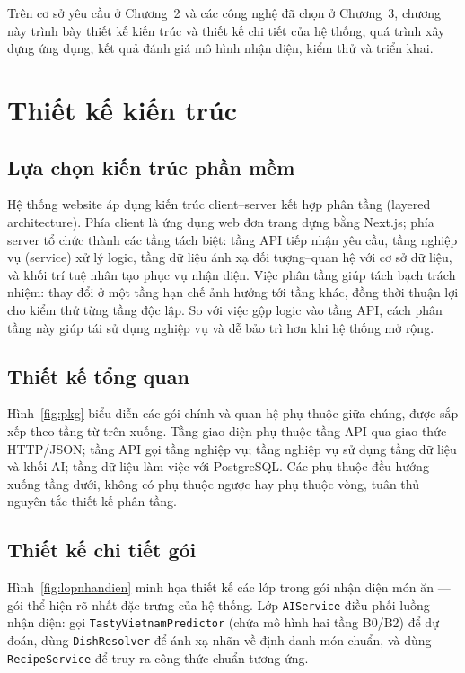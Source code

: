 \documentclass[../DoAn.tex]{subfiles}
\begin{document}
Trên cơ sở yêu cầu ở Chương~2 và các công nghệ đã chọn ở Chương~3, chương này trình bày thiết kế kiến trúc và thiết kế chi tiết của hệ thống, quá trình xây dựng ứng dụng, kết quả đánh giá mô hình nhận diện, kiểm thử và triển khai.

\section{Thiết kế kiến trúc}
\label{sec:4-kientruc}

\subsection{Lựa chọn kiến trúc phần mềm}
Hệ thống website áp dụng kiến trúc client--server kết hợp phân tầng (layered architecture). Phía client là ứng dụng web đơn trang dựng bằng Next.js; phía server tổ chức thành các tầng tách biệt: tầng API tiếp nhận yêu cầu, tầng nghiệp vụ (service) xử lý logic, tầng dữ liệu ánh xạ đối tượng--quan hệ với cơ sở dữ liệu, và khối trí tuệ nhân tạo phục vụ nhận diện. Việc phân tầng giúp tách bạch trách nhiệm: thay đổi ở một tầng hạn chế ảnh hưởng tới tầng khác, đồng thời thuận lợi cho kiểm thử từng tầng độc lập. So với việc gộp logic vào tầng API, cách phân tầng này giúp tái sử dụng nghiệp vụ và dễ bảo trì hơn khi hệ thống mở rộng.

\subsection{Thiết kế tổng quan}
Hình~\ref{fig:pkg} biểu diễn các gói chính và quan hệ phụ thuộc giữa chúng, được sắp xếp theo tầng từ trên xuống. Tầng giao diện phụ thuộc tầng API qua giao thức HTTP/JSON; tầng API gọi tầng nghiệp vụ; tầng nghiệp vụ sử dụng tầng dữ liệu và khối AI; tầng dữ liệu làm việc với PostgreSQL. Các phụ thuộc đều hướng xuống tầng dưới, không có phụ thuộc ngược hay phụ thuộc vòng, tuân thủ nguyên tắc thiết kế phân tầng.


\subsection{Thiết kế chi tiết gói}
Hình~\ref{fig:lopnhandien} minh họa thiết kế các lớp trong gói nhận diện món ăn --- gói thể hiện rõ nhất đặc trưng của hệ thống. Lớp \texttt{AIService} điều phối luồng nhận diện: gọi \texttt{TastyVietnamPredictor} (chứa mô hình hai tầng B0/B2) để dự đoán, dùng \texttt{DishResolver} để ánh xạ nhãn về định danh món chuẩn, và dùng \texttt{RecipeService} để truy ra công thức chuẩn tương ứng.
\end{document}
